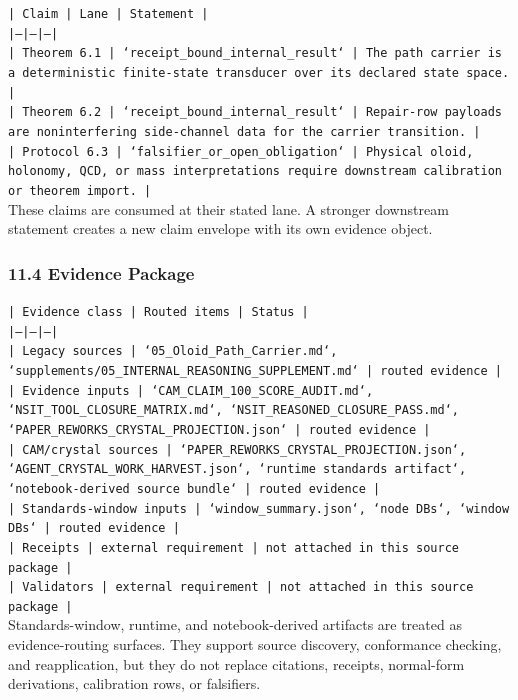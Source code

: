 \documentclass[11pt]{article}
\begin{document}
\noindent\texttt{| Claim | Lane | Statement |}\\
\noindent\texttt{|---|---|---|}\\
\noindent\texttt{| Theorem 6.1 | `receipt\_bound\_internal\_result` | The path carrier is a deterministic finite-state transducer over its declared state space. |}\\
\noindent\texttt{| Theorem 6.2 | `receipt\_bound\_internal\_result` | Repair-row payloads are noninterfering side-channel data for the carrier transition. |}\\
\noindent\texttt{| Protocol 6.3 | `falsifier\_or\_open\_obligation` | Physical oloid, holonomy, QCD, or mass interpretations require downstream calibration or theorem import. |}\\

These claims are consumed at their stated lane. A stronger downstream statement
creates a new claim envelope with its own evidence object.

\subsubsection*{11.4 Evidence Package}

\noindent\texttt{| Evidence class | Routed items | Status |}\\
\noindent\texttt{|---|---|---|}\\
\noindent\texttt{| Legacy sources | `05\_Oloid\_Path\_Carrier.md`, `supplements/05\_INTERNAL\_REASONING\_SUPPLEMENT.md` | routed evidence |}\\
\noindent\texttt{| Evidence inputs | `CAM\_CLAIM\_100\_SCORE\_AUDIT.md`, `NSIT\_TOOL\_CLOSURE\_MATRIX.md`, `NSIT\_REASONED\_CLOSURE\_PASS.md`, `PAPER\_REWORKS\_CRYSTAL\_PROJECTION.json` | routed evidence |}\\
\noindent\texttt{| CAM/crystal sources | `PAPER\_REWORKS\_CRYSTAL\_PROJECTION.json`, `AGENT\_CRYSTAL\_WORK\_HARVEST.json`, `runtime standards artifact`, `notebook-derived source bundle` | routed evidence |}\\
\noindent\texttt{| Standards-window inputs | `window\_summary.json`, `node DBs`, `window DBs` | routed evidence |}\\
\noindent\texttt{| Receipts | external requirement | not attached in this source package |}\\
\noindent\texttt{| Validators | external requirement | not attached in this source package |}\\

Standards-window, runtime, and notebook-derived artifacts are treated
as evidence-routing surfaces. They support source discovery, conformance
checking, and reapplication, but they do not replace citations, receipts,
normal-form derivations, calibration rows, or falsifiers.
\end{document}
